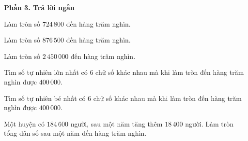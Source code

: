 \textbf{Phần 3. Trả lời ngắn}

\begin{ex} %
Làm tròn số $724\,800$ đến hàng trăm nghìn.
\end{ex}

\begin{ex} %
Làm tròn số $876\,500$ đến hàng trăm nghìn.
\end{ex}

\begin{ex} %
Làm tròn số $2\,450\,000$ đến hàng trăm nghìn.
\end{ex}

\begin{ex} %
Tìm số tự nhiên lớn nhất có 6 chữ số khác nhau mà khi làm tròn đến hàng trăm nghìn được $400\,000$.
\end{ex}

\begin{ex} %
Tìm số tự nhiên bé nhất có 6 chữ số khác nhau mà khi làm tròn đến hàng trăm nghìn được $400\,000$.
\end{ex}

\begin{ex} %
Một huyện có $184\,600$ người, sau một năm tăng thêm $18\,400$ người. Làm tròn tổng dân số sau một năm đến hàng trăm nghìn.
\end{ex}
